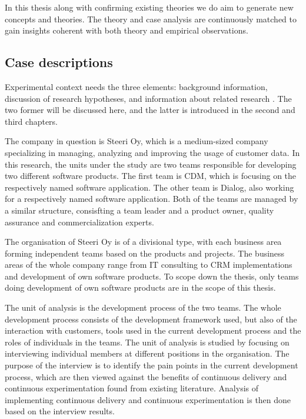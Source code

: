 \documentclass[english]{tktltiki2}
\theoremstyle{definition}
\theoremstyle{remark}
\begin{document}
In this thesis along with confirming existing theories we do aim to generate new concepts and theories. The theory and case analysis are continuously matched to gain insights coherent with both theory and empirical observations. 

\subsection{Case descriptions} %

Experimental context needs the three elements: background information, discussion of research hypotheses, and information about related research \cite{kitchenham2002preliminary}. The two former will be discussed here, and the latter is introduced in the second and third chapters.


The company in question is Steeri Oy, which is a medium-sized company specializing in managing, analyzing and improving the usage of customer data. In this research, the units under the study are two teams responsible for developing two different software products. The first team is CDM, which is focusing on the respectively named software application. The other team is Dialog, also working for a respectively named software application. Both of the teams are managed by a similar structure, consisfting a team leader and a product owner, quality assurance and commercialization experts. 

The organisation of Steeri Oy is of a divisional type, with each business area forming independent teams based on the products and projects. The business areas of the whole company range from IT consulting to CRM implementations and development of own software products. To scope down the thesis, only teams doing development of own software products are in the scope of this thesis.

The unit of analysis is the development process of the two teams. The whole development process consists of the development framework used, but also of the interaction with customers, tools used in the current development process and the roles of individuals in the teams. The unit of analysis is studied by focusing on interviewing individual members at different positions in the organisation. The purpose of the interview is to identify the pain points in the current development process, which are then viewed against the benefits of continuous delivery and continuous experimentation found from existing literature. Analysis of implementing continuous delivery and continuous experimentation is then done based on the interview results.  
\end{document}
